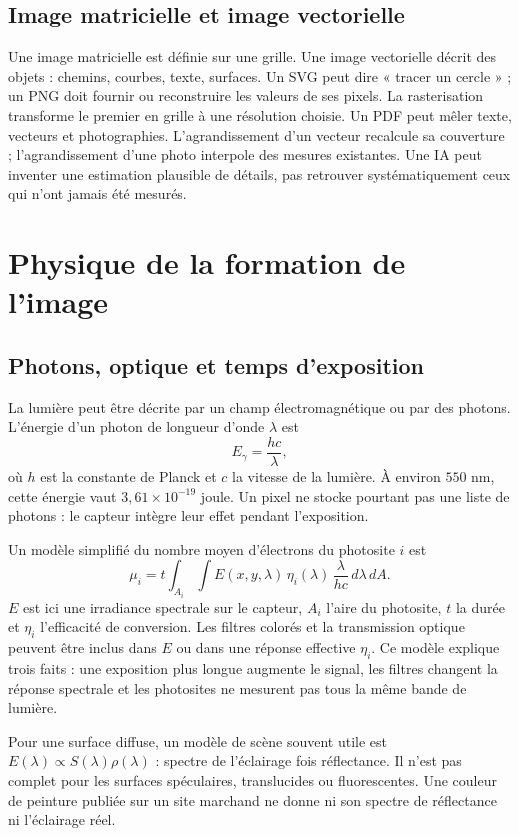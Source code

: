 \subsection{Image matricielle et image vectorielle}
Une image matricielle est définie sur une grille. Une image vectorielle
décrit des objets : chemins, courbes, texte, surfaces. Un SVG peut dire
« tracer un cercle » ; un PNG doit fournir ou reconstruire les valeurs
de ses pixels. La rasterisation transforme le premier en grille à une
résolution choisie. Un PDF peut mêler texte, vecteurs et photographies.
L'agrandissement d'un vecteur recalcule sa couverture ; l'agrandissement
d'une photo interpole des mesures existantes. Une IA peut inventer une
estimation plausible de détails, pas retrouver systématiquement ceux
qui n'ont jamais été mesurés.

\section{Physique de la formation de l'image}
\subsection{Photons, optique et temps d'exposition}
La lumière peut être décrite par un champ électromagnétique ou par des
photons. L'énergie d'un photon de longueur d'onde $\lambda$ est
\begin{equation}
E_\gamma=\frac{hc}{\lambda},
\end{equation}
où $h$ est la constante de Planck et $c$ la vitesse de la lumière.
À environ $550$ nm, cette énergie vaut $3{,}61\times10^{-19}$ joule.
Un pixel ne stocke pourtant pas une liste de photons : le capteur
intègre leur effet pendant l'exposition.

Un modèle simplifié du nombre moyen d'électrons du photosite $i$ est
\begin{equation}
\mu_i=t\int_{A_i}\int E(x,y,\lambda)\,
\eta_i(\lambda)\,\frac{\lambda}{hc}\,d\lambda\,dA.
\end{equation}
$E$ est ici une irradiance spectrale sur le capteur, $A_i$ l'aire du
photosite, $t$ la durée et $\eta_i$ l'efficacité de conversion. Les filtres
colorés et la transmission optique peuvent être inclus dans $E$ ou
dans une réponse effective $\eta_i$. Ce modèle explique trois faits :
une exposition plus longue augmente le signal, les filtres changent
la réponse spectrale et les photosites ne mesurent pas tous la même
bande de lumière.

Pour une surface diffuse, un modèle de scène souvent utile est
$E(\lambda)\propto S(\lambda)\rho(\lambda)$ : spectre de l'éclairage
fois réflectance. Il n'est pas complet pour les surfaces spéculaires,
translucides ou fluorescentes. Une couleur de peinture publiée sur un
site marchand ne donne ni son spectre de réflectance ni l'éclairage réel.

